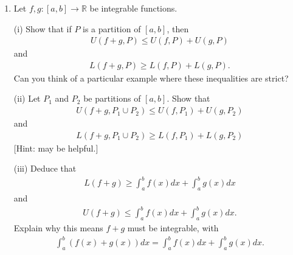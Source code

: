 \documentclass[letterpaper,10pt,english]{jupyterBook}
\begin{document}
\label{\detokenize{Problems:id70}}\begin{enumerate}
%
\setcounter{enumi}{69}
\item {} 
\sphinxAtStartPar
Let \(f,g:[a,b]\to\mathbb{R}\) be integrable functions.

\sphinxAtStartPar
(i) Show that if \(P\) is a partition of \([a,b]\), then
\begin{equation*}
\begin{split}
    U(f+g,P) \leq U(f,P)+U(g,P)
    \end{split}
\end{equation*}
\sphinxAtStartPar
and
\begin{equation*}
\begin{split}
    L(f+g,P) \geq L(f,P)+L(g,P).
    \end{split}
\end{equation*}
\sphinxAtStartPar
Can you think of a particular example where these inequalities are strict?

\sphinxAtStartPar
(ii) Let \(P_1\) and \(P_2\) be partitions of \([a,b]\). Show that
\begin{equation*}
\begin{split}
    U(f+g,P_1\cup P_2) \leq U(f,P_1) + U(g,P_2)
    \end{split}
\end{equation*}
\sphinxAtStartPar
and
\begin{equation*}
\begin{split}
    L(f+g,P_1\cup P_2) \geq L(f,P_1) + L(g,P_2)
    \end{split}
\end{equation*}
\sphinxAtStartPar
{[}Hint:  may be helpful.{]}

\sphinxAtStartPar
(iii) Deduce that
\begin{equation*}
\begin{split}
    L(f+g) \geq \int_a^bf(x)dx + \int_a^bg(x)dx
    \end{split}
\end{equation*}
\sphinxAtStartPar
and
\begin{equation*}
\begin{split}
    U(f+g) \leq \int_a^bf(x)dx + \int_a^bg(x)dx.
    \end{split}
\end{equation*}
\sphinxAtStartPar
Explain why this means \(f+g\) must be integrable, with
\begin{equation*}
\begin{split}
    \int_a^b(f(x)+g(x))dx = \int_a^bf(x)dx + \int_a^bg(x)dx.
    \end{split}
\end{equation*}
\end{enumerate}
\end{document}
